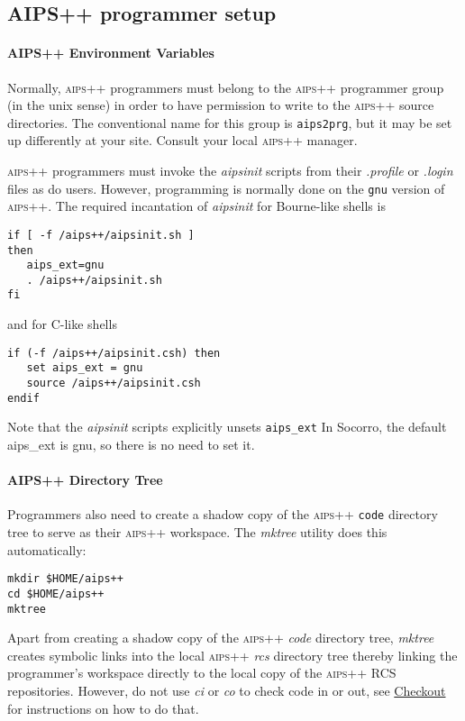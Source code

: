 \subsection{\textsc{AIPS++} programmer setup}
\paragraph{\textsc{AIPS++} Environment Variables}
Normally, \textsc{aips++} programmers must belong to the \textsc{aips++} programmer
group (in the unix sense) in order to have permission to write to the
\textsc{aips++} source directories.  The conventional name for this group is
\texttt{aips2prg}, but it may be set up differently at your site.  Consult your
local \textsc{aips++} manager.

\textsc{aips++} programmers must invoke the \textit{aipsinit} scripts from their
\textsl{.profile} or \textsl{.login} files as do users.  However, programming
is normally done on the \texttt{gnu} version of \textsc{aips++}. The required
incantation of \textit{aipsinit} for Bourne-like shells is

\begin{verbatim}
if [ -f /aips++/aipsinit.sh ]
then
   aips_ext=gnu
   . /aips++/aipsinit.sh
fi
\end{verbatim}

\noindent
and for C-like shells

\begin{verbatim}
if (-f /aips++/aipsinit.csh) then
   set aips_ext = gnu
   source /aips++/aipsinit.csh
endif
\end{verbatim}

\noindent
Note that the \textit{aipsinit} scripts explicitly unsets \texttt{aips\_ext}
In Socorro, the default aips\_ext is gnu, so there is no need to set it.

\paragraph{\textsc{AIPS++} Directory Tree}
Programmers also need to create a shadow copy of the \textsc{aips++} \texttt{code}
directory tree to serve as their \textsc{aips++} workspace.  The \textit{mktree}
utility does this automatically:

\begin{verbatim}
mkdir $HOME/aips++
cd $HOME/aips++
mktree
\end{verbatim}

\noindent
Apart from creating a shadow copy of the \textsc{aips++} \textsl{code} directory
tree, \textit{mktree} creates symbolic links into the local \textsc{aips++} \textsl{rcs}
directory tree thereby linking the programmer's workspace directly to the
local copy of the \textsc{aips++} \textsc{RCS} repositories.  However, do not use
\textit{ci} or \textit{co} to check code in or out, see \hyperref{Checkout}{Checkout (see AIPS++ System Manual, Section }{ for more details)}{Checkout} for instructions
on how to do that.

